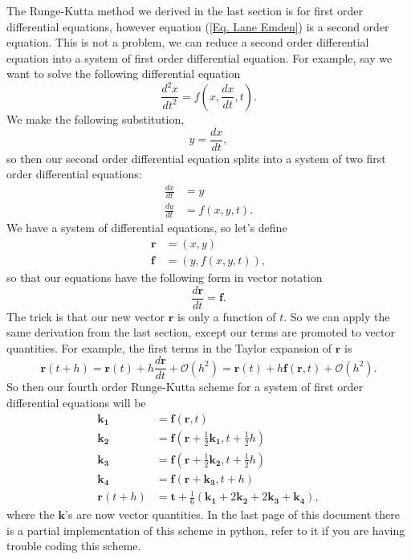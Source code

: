 \documentclass{article}
\begin{document}
The Runge-Kutta method we derived in the last section is for first order differential equations, however equation (\ref{Eq. Lane Emden}) is a second order equation. This is not a problem, we can reduce a second order differential equation into a system of first order differential equation. For example, say we want to solve the following differential equation
\begin{equation}
\frac{d^2x}{dt^2} = f(x, \frac{dx}{dt}, t).
\end{equation}
We make the following substitution,
\begin{equation}
y = \frac{dx}{dt},
\end{equation}
so then our second order differential equation splits into a system of two first order differential equations:
\begin{align*}
\frac{dx}{dt} & = y\\
\frac{dy}{dt} & = f(x,y,t).
\end{align*}
We have a system of differential equations, so let's define
\begin{align*}
\mathbf{r} & = (x, y)\\
\mathbf{f} & = (y, f(x,y,t)),
\end{align*}
so that our equations have the following form in vector notation
\begin{equation*}
\frac{d\mathbf{r}}{dt} = \mathbf{f}.
\end{equation*}
The trick is that our new vector $\mathbf{r}$ is only a function of $t$. So we can apply the same derivation from the last section, except our terms are promoted to vector quantities. For example, the first terms in the Taylor expansion of $\mathbf{r}$ is
\begin{equation*}
\mathbf{r}(t+h) = \mathbf{r}(t) + h\frac{d\mathbf{r}}{dt} + \mathcal{O}\left(h^2\right) = \mathbf{r}(t) + h\mathbf{f}(\mathbf{r}, t) + \mathcal{O}\left(h^2\right).
\end{equation*}
So then our fourth order Runge-Kutta scheme for a system of first order differential equations will be
\begin{align}
\label{Eq. Runge-Kutta k1}
\mathbf{k_1} &= \mathbf{f}(\mathbf{r}, t)\\
\label{Eq. Runge-Kutta k2}
\mathbf{k_2} &= \mathbf{f}(\mathbf{r} +\frac{1}{2}\mathbf{k_1}, t+\frac{1}{2}h)\\
\label{Eq. Runge-Kutta k3}
\mathbf{k_3} &= \mathbf{f}(\mathbf{r} +\frac{1}{2}\mathbf{k_2}, t+\frac{1}{2}h)\\
\label{Eq. Runge-Kutta k4}
\mathbf{k_4} &= \mathbf{f}(\mathbf{r} +\mathbf{k_3}, t+h)\\
\label{Eq. Runge-Kutta}
\mathbf{r}(t+h) &= \mathbf{t}+\frac{1}{6}(\mathbf{k_1}+2\mathbf{k_2}+2\mathbf{k_3}+\mathbf{k_4}),
\end{align}
where the $\mathbf{k}$'s are now vector quantities. In the last page of this document there is a partial implementation of this scheme in python, refer to it if you are having trouble coding this scheme.
\end{document}
